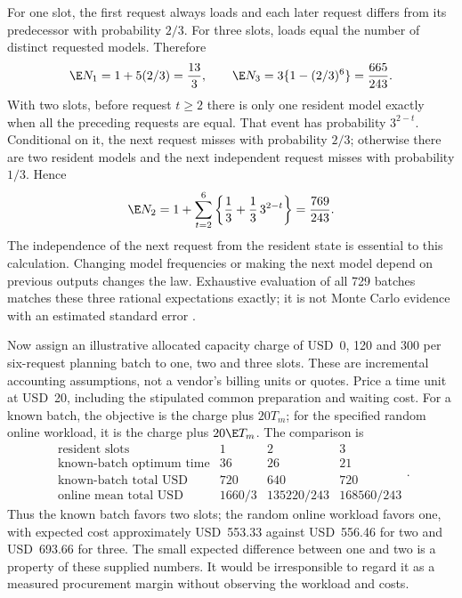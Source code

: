 For one slot, the first request always loads and each later request differs
from its predecessor with probability $2/3$. For three slots, loads equal the
number of distinct requested models. Therefore
\begin{equation}
 \E N_1=1+5(2/3)=\frac{13}{3},\qquad
 \E N_3=3\{1-(2/3)^6\}=\frac{665}{243}.
 \label{exec17:s8-resident-means13}
\end{equation}
With two slots, before request $t\geq2$ there is only one resident model
exactly when all the preceding requests are equal. That event has probability
$3^{2-t}$. Conditional on it, the next request misses with probability $2/3$;
otherwise there are two resident models and the next independent request
misses with probability $1/3$. Hence
\begin{equation}
 \E N_2=1+\sum_{t=2}^{6}\left\{\frac13+\frac13\,3^{2-t}\right\}
       =\frac{769}{243}.
 \label{exec17:s8-resident-mean2}
\end{equation}
The independence of the next request from the resident state is essential to
this calculation. Changing model frequencies or making the next model depend
on previous outputs changes the law. Exhaustive evaluation of all 729 batches
matches these three rational expectations exactly; it is not Monte Carlo
evidence with an estimated standard error \citep{exec17_s8_residency}.

Now assign an illustrative allocated capacity charge of USD~0, 120 and 300
per six-request planning batch to one, two and three slots. These are
incremental accounting assumptions, not a vendor's billing units or quotes.
Price a time unit at USD~20, including the stipulated common preparation and
waiting cost. For a known batch, the objective is the charge plus $20T_m$;
for the specified random online workload, it is the charge plus $20\E T_m$.
The comparison is
\begin{equation}
\begin{array}{c|rrr}
 \text{resident slots}&1&2&3\\ \hline
 \text{known-batch optimum time}&36&26&21\\
 \text{known-batch total USD}&720&640&720\\
 \text{online mean total USD}&1660/3&135220/243&168560/243
\end{array}.
\label{exec17:s8-resident-prices}
\end{equation}
Thus the known batch favors two slots; the random online workload favors one,
with expected cost approximately USD~553.33 against USD~556.46 for two and
USD~693.66 for three. The small expected difference between one and two is a
property of these supplied numbers. It would be irresponsible to regard it
as a measured procurement margin without observing the workload and costs.

